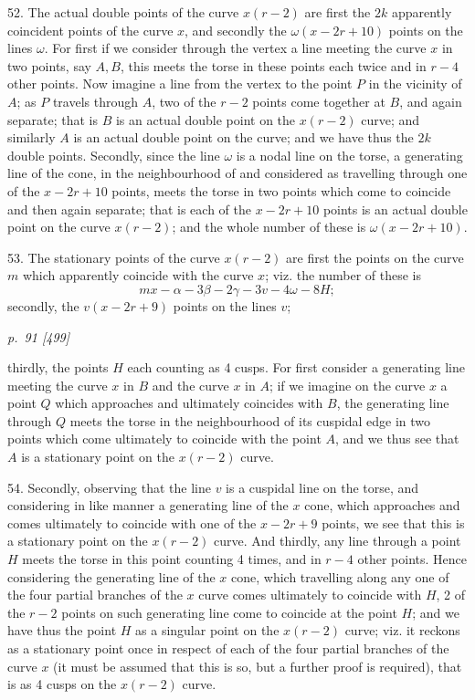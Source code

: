 \documentclass[11pt,a4paper]{article}
\newcommand{\pagemarker}[2]{\clearpage\noindent\textit{p.~#1 [#2]}\par\medskip}
\begin{document}
52. The actual double points of the curve \(x(r-2)\) are first the \(2k\) apparently
coincident points of the curve \(x\), and secondly the \(\omega(x-2r+10)\) points on the
lines \(\omega\). For first if we consider through the vertex a line meeting the curve
\(x\) in two points, say \(A,B\), this meets the torse in these points each twice and in
\(r-4\) other points. Now imagine a line from the vertex to the point \(P\) in the
vicinity of \(A\); as \(P\) travels through \(A\), two of the \(r-2\) points come together
at \(B\), and again separate; that is \(B\) is an actual double point on the \(x(r-2)\)
curve; and similarly \(A\) is an actual double point on the curve; and we have thus
the \(2k\) double points. Secondly, since the line \(\omega\) is a nodal line on the
torse, a generating line of the cone, in the neighbourhood of and considered as
travelling through one of the \(x-2r+10\) points, meets the torse in two points which
come to coincide and then again separate; that is each of the \(x-2r+10\) points is
an actual double point on the curve \(x(r-2)\); and the whole number of these is
\(\omega(x-2r+10)\).

53. The stationary points of the curve \(x(r-2)\) are first the points on the curve
\(m\) which apparently coincide with the curve \(x\); viz. the number of these is
\[
  mx-\alpha-3\beta-2\gamma-3v-4\omega-8H;
\]
secondly, the \(v(x-2r+9)\) points on the lines \(v\);

\pagemarker{91}{499}
thirdly, the points \(H\) each counting as 4 cusps. For first consider a generating line
meeting the curve \(x\) in \(B\) and the curve \(x\) in \(A\); if we imagine on the curve
\(x\) a point \(Q\) which approaches and ultimately coincides with \(B\), the generating
line through \(Q\) meets the torse in the neighbourhood of its cuspidal edge in two
points which come ultimately to coincide with the point \(A\), and we thus see that
\(A\) is a stationary point on the \(x(r-2)\) curve.

54. Secondly, observing that the line \(v\) is a cuspidal line on the torse, and
considering in like manner a generating line of the \(x\) cone, which approaches and
comes ultimately to coincide with one of the \(x-2r+9\) points, we see that this is a
stationary point on the \(x(r-2)\) curve. And thirdly, any line through a point \(H\)
meets the torse in this point counting 4 times, and in \(r-4\) other points. Hence
considering the generating line of the \(x\) cone, which travelling along any one of
the four partial branches of the \(x\) curve comes ultimately to coincide with \(H\),
2 of the \(r-2\) points on such generating line come to coincide at the point \(H\);
and we have thus the point \(H\) as a singular point on the \(x(r-2)\) curve; viz. it
reckons as a stationary point once in respect of each of the four partial branches of
the curve \(x\) (it must be assumed that this is so, but a further proof is required),
that is as 4 cusps on the \(x(r-2)\) curve.
\end{document}
